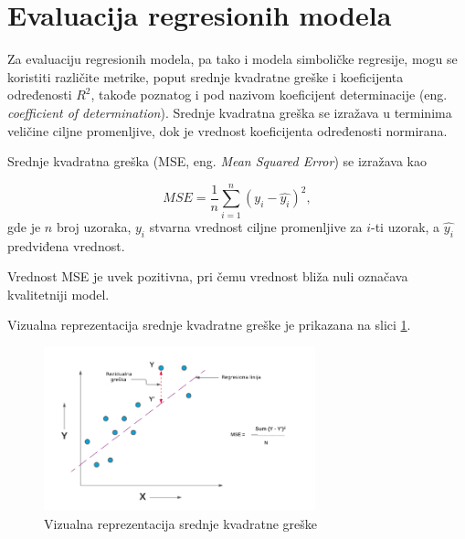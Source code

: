 \documentclass[main.tex]{subfiles}
\begin{document}
\section{Evaluacija regresionih modela}
\label{sec:evaluacija}

Za evaluaciju regresionih modela, pa tako i modela simboličke regresije, mogu se koristiti različite metrike, poput srednje kvadratne greške i koeficijenta određenosti $R^{2}$, takođe poznatog i pod nazivom koeficijent determinacije (eng. \textit{coefficient of determination}).  
Srednje kvadratna greška se izražava u terminima veličine ciljne promenljive, dok
je vrednost koeficijenta određenosti normirana.

Srednje kvadratna greška (MSE, eng. \textit{Mean Squared Error}) se izražava kao

 \[ MSE = \frac{1}{n} \sum_{i=1}^{n}(y_i - \hat{y_i})^{2}, \]
 gde je $n$ broj uzoraka, $y_i$ stvarna vrednost ciljne promenljive za $i$-ti uzorak, a $\hat{y_i}$ predviđena vrednost.
 
 Vrednost MSE je uvek pozitivna, pri čemu vrednost bliža nuli označava kvalitetniji model.
 
 Vizualna reprezentacija srednje kvadratne greške je prikazana na slici \ref{fig:MSE}.

\begin{figure}[!ht]
\begin{center}
\includegraphics[width=0.7\textwidth]{../images/mse.jpg}
\end{center}
\caption{Vizualna reprezentacija srednje kvadratne greške}
\label{fig:MSE}
\end{figure}

 

 
\end{document}
